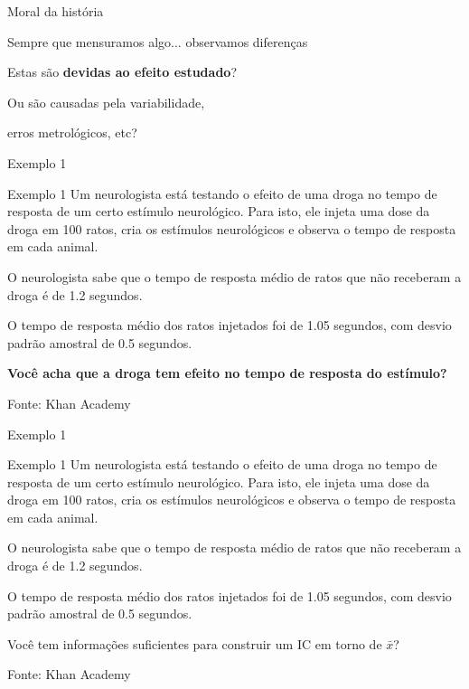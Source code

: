 \documentclass{beamer}
\begin{document}
\begin{frame}[label=mensagem]{\scriptsize Moral da história}
  \begin{center}
    Sempre que mensuramos algo... observamos diferenças

    \bigskip
    \bigskip
    \bigskip
    \bigskip
    Estas são {\bf devidas ao efeito estudado}?

    \bigskip
    Ou são causadas pela variabilidade,

    erros metrológicos, etc?
  \end{center}
\end{frame}

\begin{frame}[label=exemplo1]{\scriptsize Exemplo 1}
  \begin{exampleblock}{Exemplo 1}
    \scriptsize
    Um neurologista está testando o efeito de uma droga no tempo de
    resposta de um certo estímulo neurológico.
    Para isto, ele injeta uma dose da droga em \alert{100} ratos, cria
    os estímulos neurológicos e observa o tempo de resposta em cada
    animal.

    \medskip
    O neurologista sabe que o tempo de resposta médio de ratos que não
    receberam a droga é de \alert{1.2 segundos}.

    \medskip
    O tempo de resposta médio dos ratos injetados foi de
    \alert{1.05 segundos}, com desvio padrão amostral de
    \alert{0.5 segundos}.
  \end{exampleblock}
  \begin{block}{}
    \scriptsize
    {\bf Você acha que a droga tem efeito no tempo de resposta do estímulo?}
  \end{block}
  \hfill {\scriptsize Fonte: Khan Academy}
\end{frame}

\begin{frame}{\scriptsize Exemplo 1}
  \begin{exampleblock}{Exemplo 1}
    \tiny
    Um neurologista está testando o efeito de uma droga no tempo de
    resposta de um certo estímulo neurológico.
    Para isto, ele injeta uma dose da droga em \alert{100} ratos, cria
    os estímulos neurológicos e observa o tempo de resposta em cada
    animal.

    \medskip
    O neurologista sabe que o tempo de resposta médio de ratos que não
    receberam a droga é de \alert{1.2 segundos}.

    \medskip
    O tempo de resposta médio dos ratos injetados foi de
    \alert{1.05 segundos}, com desvio padrão amostral de
    \alert{0.5 segundos}.
  \end{exampleblock}
  \begin{block}{}
    \scriptsize
    Você tem informações suficientes para construir um IC em torno de $\bar{x}$?
  \end{block}
  \hfill {\scriptsize Fonte: Khan Academy}
\end{frame}
\end{document}
